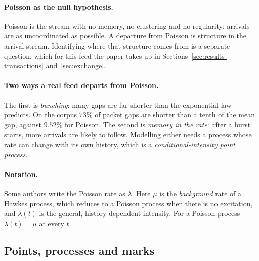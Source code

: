 \paragraph{Poisson as the null hypothesis.} Poisson is the stream with no memory, no
clustering and no regularity: arrivals are as uncoordinated as possible. A departure
from Poisson is structure in the arrival stream. Identifying where that structure comes
from is a separate question, which for this feed the paper takes up in
Sections~\ref{sec:results-transactions} and~\ref{sec:exchange}.

\paragraph{Two ways a real feed departs from Poisson.} The first is \emph{bunching}:
many gaps are far shorter than the exponential law predicts. On the corpus $73\%$ of
packet gaps are shorter than a tenth of the mean gap, against $9.52\%$ for Poisson. The
second is \emph{memory in the rate}: after a burst starts, more arrivals are likely to
follow. Modelling either needs a process whose rate can change with its own history,
which is a \emph{conditional-intensity point process}.

\paragraph{Notation.} Some authors write the Poisson rate as $\lambda$. Here $\mu$ is the
\emph{background} rate of a Hawkes process, which reduces to a Poisson process when there
is no excitation, and $\lambda(t)$ is the general, history-dependent intensity. For a
Poisson process $\lambda(t) = \mu$ at every $t$.

\subsection{Points, processes and marks}
\label{app:pp-pointprocess}

